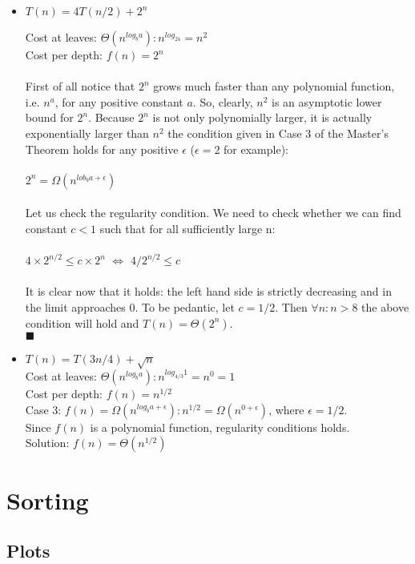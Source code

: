\documentclass[a4paper]{article}
\begin{document}
\begin{itemize}
\item $T(n) = 4T(n/2) + 2^n$

Cost at leaves: $\Theta(n^{log_ba}): n^{log_24} = n^2$ \\
Cost per depth: $f(n) = 2^n$ \\
\\
First of all notice that $2^n$ grows much faster than any polynomial function, i.e. $n^a$, for any positive constant $a$. So, clearly, $n^2$ is an asymptotic lower bound for $2^n$. Because $2^n$ is not only polynomially larger, it is actually exponentially larger than $n^2$ the condition given in Case 3 of the Master's Theorem holds for any positive $\epsilon$ ($\epsilon = 2$ for example): \\ \\
$2^n = \Omega(n^{lob_ba + \epsilon})$ \\ \\
Let us check the regularity condition. We need to check whether we can find constant $c<1$ such that for all sufficiently large n: \\ \\
$4\times2^{n/2} \leq c \times 2^n$ $\Leftrightarrow$ $ 4/2^{n/2} \leq c$ \\ \\
It is clear now that it holds: the left hand side is strictly decreasing and in the limit approaches $0$. To be pedantic, let $c=1/2$. Then $\forall n: n>8$ the above condition will hold and $T(n) = \Theta(2^n)$. \\
$\blacksquare$

\item $T(n) = T(3n/4) + \sqrt{n}$\\
Cost at leaves: $\Theta(n^{log_ba}): n^{log_{4/3} 1} = n^0 = 1$ \\ 
Cost per depth: $f(n) = n^{1/2}$ \\
Case 3: $f(n) =  \Omega(n^{log_ba + \epsilon}): n^{1/2} =  \Omega(n^{0+\epsilon})$, where $\epsilon = 1/2$. \\
Since $f(n)$ is a polynomial function, regularity conditions holds. \\
Solution: $f(n) = \Theta(n^{1/2})$

\end{itemize}

\section{Sorting}

\subsection{Plots}
\end{document}
